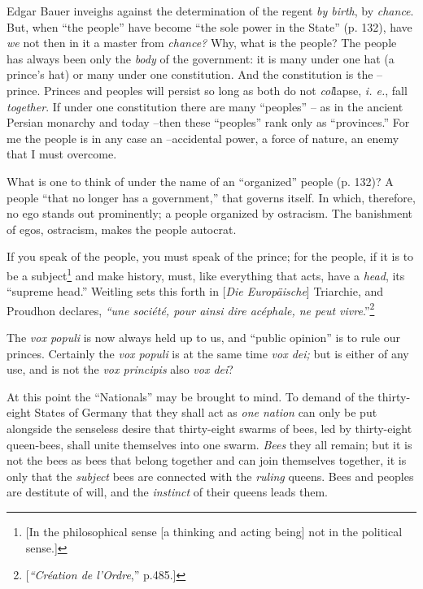 \documentclass[12pt,a4paper]{book}
\begin{document}
Edgar Bauer inveighs against the determination of the regent \textit{by 
birth}, by \textit{chance}. But, when ``the people'' have become ``the sole 
power in the State'' (p. 132), have \textit{we} not then in it a master from 
\textit{chance?} Why, what is the people? The people has always been only the 
\textit{body} of the government: it is many under one hat (a prince's hat) or 
many under one constitution. And the constitution is the -- prince. Princes 
and peoples will persist so long as both do not \textit{col}lapse, \textit{i. 
e.}, fall \textit{together}. If under one constitution there are many 
``peoples'' -- as in the ancient Persian monarchy and today --then these 
``peoples'' rank only as ``provinces.'' For me the people is in any case 
an --accidental power, a force of nature, an enemy that I must overcome.

What is one to think of under the name of an ``organized'' people (p. 132)? 
A people ``that no longer has a government,'' that governs itself. In which, 
therefore, no ego stands out prominently; a people organized by ostracism. The 
banishment of egos, ostracism, makes the people autocrat.

If you speak of the people, you must speak of the prince; for the people, if 
it is to be a subject\footnote{[In the philosophical sense [a thinking and 
acting being] not in the political sense.]} and make history, must, like 
everything that acts, have a \textit{head}, its ``supreme head.'' Weitling 
sets this forth in [\textit{Die Europ\"aische}] Triarchie, and Proudhon 
declares, \textit{``une soci\'et\'e, pour ainsi dire ac\'ephale, ne peut 
vivre}.''\footnote{[\textit{``Cr\'eation de l'Ordre},'' p.485.]}

The \textit{vox populi} is now always held up to us, and ``public opinion'' 
is to rule our princes. Certainly the \textit{vox populi} is at the same time 
\textit{vox dei;} but is either of any use, and is not the \textit{vox 
principis} also \textit{vox dei}?

At this point the ``Nationals'' may be brought to mind. To demand of the 
thirty-eight States of Germany that they shall act as \textit{one nation} can 
only be put alongside the senseless desire that thirty-eight swarms of bees, 
led by thirty-eight queen-bees, shall unite themselves into one swarm. 
\textit{Bees} they all remain; but it is not the bees as bees that belong 
together and can join themselves together, it is only that the 
\textit{subject} bees are connected with the \textit{ruling} queens. Bees and 
peoples are destitute of will, and the \textit{instinct} of their queens leads 
them.
\end{document}
